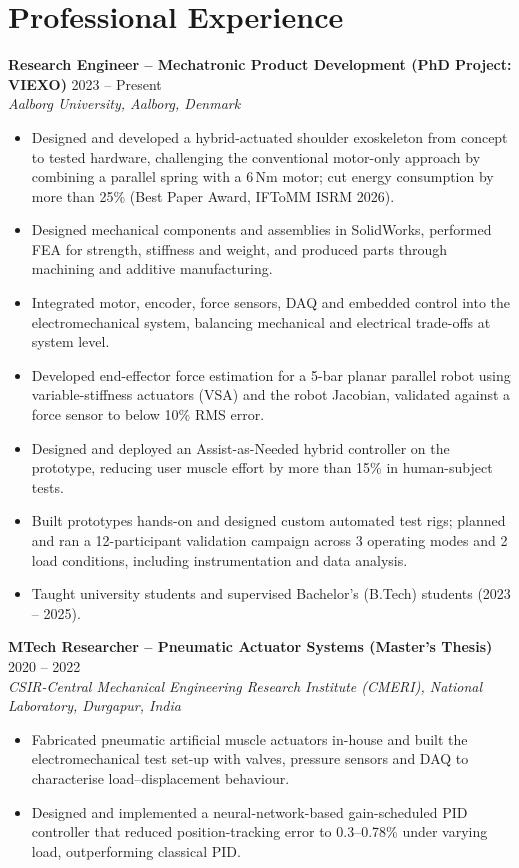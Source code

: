 \documentclass[10pt,a4paper]{article}
\newcommand{\role}[3]{\textbf{#1} \textbar{} #2\\\textit{#3}\par}
\begin{document}
\section{Professional Experience}
\role{Research Engineer -- Mechatronic Product Development (PhD Project: VIEXO)}{2023 -- Present}{Aalborg University, Aalborg, Denmark}
\begin{itemize}
\item Designed and developed a hybrid-actuated shoulder exoskeleton from concept to tested hardware, challenging the conventional motor-only approach by combining a parallel spring with a 6\,Nm motor; cut energy consumption by more than 25\% (Best Paper Award, IFToMM ISRM 2026).
\item Designed mechanical components and assemblies in SolidWorks, performed FEA for strength, stiffness and weight, and produced parts through machining and additive manufacturing.
\item Integrated motor, encoder, force sensors, DAQ and embedded control into the electromechanical system, balancing mechanical and electrical trade-offs at system level.
\item Developed end-effector force estimation for a 5-bar planar parallel robot using variable-stiffness actuators (VSA) and the robot Jacobian, validated against a force sensor to below 10\% RMS error.
\item Designed and deployed an Assist-as-Needed hybrid controller on the prototype, reducing user muscle effort by more than 15\% in human-subject tests.
\item Built prototypes hands-on and designed custom automated test rigs; planned and ran a 12-participant validation campaign across 3 operating modes and 2 load conditions, including instrumentation and data analysis.
\item Taught university students and supervised Bachelor's (B.Tech) students (2023 -- 2025).
\end{itemize}

\role{MTech Researcher -- Pneumatic Actuator Systems (Master's Thesis)}{2020 -- 2022}{CSIR-Central Mechanical Engineering Research Institute (CMERI), National Laboratory, Durgapur, India}
\begin{itemize}
\item Fabricated pneumatic artificial muscle actuators in-house and built the electromechanical test set-up with valves, pressure sensors and DAQ to characterise load--displacement behaviour.
\item Designed and implemented a neural-network-based gain-scheduled PID controller that reduced position-tracking error to 0.3--0.78\% under varying load, outperforming classical PID.
\end{itemize}
\end{document}

